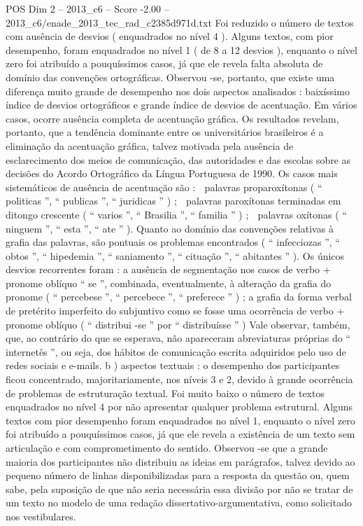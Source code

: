 \begin{textsample}{POS Dim 2 – 2013\_c6 – Score -2.00 – 2013\_c6/enade\_2013\_tec\_rad\_c2385d971d.txt}
Foi reduzido o número de textos com ausência de desvios ( enquadrados no nível 4 ).
Alguns textos, com pior desempenho, foram enquadrados no nível 1 ( de 8 a 12 desvios ), enquanto o nível zero foi atribuído a pouquíssimos casos, já que ele revela falta absoluta de domínio das convenções ortográficas.
Observou -se, portanto, que existe uma diferença muito grande de desempenho nos dois aspectos analisados : baixíssimo índice de desvios ortográficos e grande índice de desvios de acentuação.
Em vários casos, ocorre ausência completa de acentuação gráfica.
Os resultados revelam, portanto, que a tendência dominante entre os universitários brasileiros é a eliminação da acentuação gráfica, talvez motivada pela ausência de esclarecimento dos meios de comunicação, das autoridades e das escolas sobre as decisões do Acordo Ortográfico da Língua Portuguesa de 1990.
Os casos mais sistemáticos de ausência de acentuação são :  palavras proparoxítonas ( “ politicas ”, “ publicas ”, “ juridicas ” ) ;  palavras paroxítonas terminadas em ditongo crescente ( “ varios ”, “ Brasilia ”, “ familia ” ) ;  palavras oxítonas ( “ ninguem ”, “ esta ”, “ ate ” ).
Quanto ao domínio das convenções relativas à grafia das palavras, são pontuais os problemas encontrados ( “ infecciozas ”, “ obtos ”, “ hipedemia ”, “ saniamento ”, “ cituação ”, “ abitantes ” ).
Os únicos desvios recorrentes foram : a ausência de segmentação nos casos de verbo + pronome oblíquo “ se ”, combinada, eventualmente, à alteração da grafia do pronome ( “ percebese ”, “ percebece ”, “ preferece ” ) ; a grafia da forma verbal de pretérito imperfeito do subjuntivo como se fosse uma ocorrência de verbo + pronome oblíquo ( “ distribui -se ” por “ distribuísse ” ) Vale observar, também, que, ao contrário do que se esperava, não apareceram abreviaturas próprias do “ internetês ”, ou seja, dos hábitos de comunicação escrita adquiridos pelo uso de redes sociais e e-mails. b ) aspectos textuais : o desempenho dos participantes ficou concentrado, majoritariamente, nos níveis 3 e 2, devido à grande ocorrência de problemas de estruturação textual.
Foi muito baixo o número de textos enquadrados no nível 4 por não apresentar qualquer problema estrutural.
Alguns textos com pior desempenho foram enquadrados no nível 1, enquanto o nível zero foi atribuído a pouquíssimos casos, já que ele revela a existência de um texto sem articulação e com comprometimento do sentido.
Observou -se que a grande maioria dos participantes não distribuiu as ideias em parágrafos, talvez devido ao pequeno número de linhas disponibilizadas para a resposta da questão ou, quem sabe, pela suposição de que não seria necessária essa divisão por não se tratar de um texto no modelo de uma redação dissertativo-argumentativa, como solicitado nos vestibulares.

\end{textsample}
